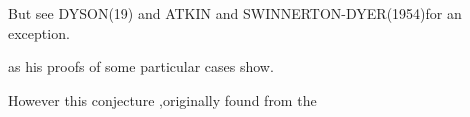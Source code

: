 \noindent\handwritten{\rule{\linewidth}{0.4pt}}

\noindent{}

\noindent *But see DYSON(19) and ATKIN and SWINNERTON-DYER(1954)for an exception.

\noindent\handwritten{\rule{\linewidth}{0.4pt}}

\noindent as his proofs of some particular cases show.

However this conjecture ,originally found from the

